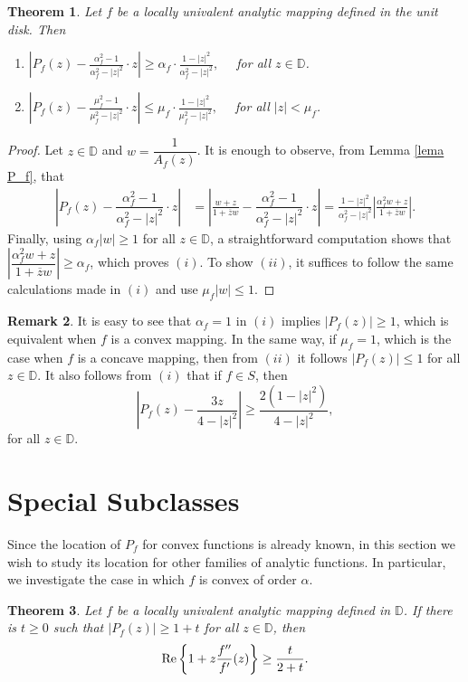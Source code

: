 \documentclass[reqno]{amsart}
\theoremstyle{plain}
\newtheorem{theo}{Theorem}[section]
\theoremstyle{definition}
\newtheorem{rem}[theo]{Remark}
\newcommand{\D}{\mathbb{D}}
\begin{document}
\begin{theo} Let $f$ be a locally univalent analytic mapping defined in the unit disk. Then
\begin{enumerate}[wide]
   \item [$(i)$] \(\displaystyle\left|P_f(z)-\frac{\alpha_f^2-1}{\alpha_f^2-|z|^2}\cdot z\right|\geq \alpha_f\cdot\frac{1-|z|^2}{\alpha_f^2-|z|^2},\quad \)
for all $z\in \D$.
\item [$(ii)$]
\(\displaystyle\left|P_f(z)-\frac{\mu_f^2-1}{\mu_f^2-|z|^2}\cdot z\right|\leq \mu_f\cdot\frac{1-|z|^2}{\mu_f^2-|z|^2},\quad\) for all $|z|<\mu_f$.
\end{enumerate}
\end{theo}
\begin{proof}
 Let $z\in \D$ and $w=\dfrac{1}{A_f(z)}$. It is enough to observe, from Lemma \ref{lema P_f}, that
\begin{align*}
  \left|P_f(z)-\dfrac{\alpha_f^2-1}{\alpha_f^2-|z|^2}\cdot z\right|& =\left|\frac{w+z}{1+\overline{z}w}-\dfrac{\alpha_f^2-1}{\alpha_f^2-|z|^2}\cdot z\right|=\frac{1-|z|^2}{\alpha_f^2-|z|^2}\left|\frac{\alpha_f^2w+z}{1+\overline{z}w}\right|.
\end{align*}
Finally, using $\alpha_f|w|\geq 1$ for all $z\in \D$, a straightforward computation shows that $\left|\dfrac{\alpha_f^2w+z}{1+\overline{z}w}\right|\geq \alpha_f$, which proves $(i)$. To show $(ii)$, it suffices to follow the same calculations made in $(i)$ and use $\mu_f|w|\leq 1$.
\end{proof}


\begin{rem}
  It is easy to see that $\alpha_f=1$ in $(i)$ implies $|P_f(z)|\geq 1$, which is equivalent when $f$ is a convex mapping. In the same way, if $\mu_f=1$, which is the case when $f$ is a concave mapping, then from $(ii)$ it follows $|P_f(z)|\leq 1$ for all $z\in\D$. It also follows from $(i)$ that if $f\in S$, then
\[\left|P_f(z)-\frac{3z}{4-|z|^2}\right|\geq \frac{2(1-|z|^2)}{4-|z|^2},\]
for all $z\in \D$.  
\end{rem}

\section{Special Subclasses}
Since the location of $P_f$ for convex functions is already known, in this section we wish to study its location for other families of analytic functions. In particular, we investigate the case in which $f$ is convex of order $\alpha$.
\begin{theo} Let $f$ be a locally univalent analytic mapping defined in $\D$. If there is $t\geq 0$ such that $|P_f(z)|\geq 1+t$ for all $z\in\D$, then
\[\textup{Re} \left\{1+z\frac{f''}{f'}(z)\right\}\geq \frac{t}{2+t}.\]
\end{theo}
\end{document}
